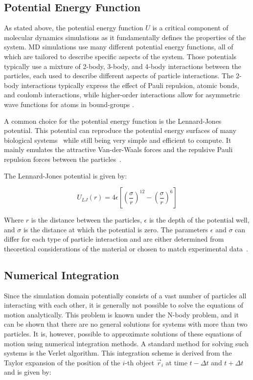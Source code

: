 \subsection{Potential Energy Function}

As stated above, the potential energy function $U$ is a critical component of molecular dynamics simulations as it fundamentally defines the properties of the system. MD simulations use many different potential energy functions, all of which are tailored to describe specific aspects of the system. Those potentials typically use a mixture of 2-body, 3-body, and 4-body interactions between the particles, each used to describe different aspects of particle interactions. The 2-body interactions typically express the effect of Pauli repulsion, atomic bonds, and coulomb interactions, while higher-order interactions allow for asymmetric wave functions for atoms in bound-groups \cite{Leimkuhler2015}.

A common choice for the potential energy function is the Lennard-Jones potential. This potential can reproduce the potential energy surfaces of many biological systems~\cite{NexusPhysicsLennardJones} while still being very simple and efficient to compute. It mainly emulates the attractive Van-der-Waals forces and the repulsive Pauli repulsion forces between the particles~\cite{ChemieLexikonLennardJones}.

The Lennard-Jones potential is given by:

\begin{equation}
      U_{LJ}(r) = 4 \epsilon \left[ \left( \frac{\sigma}{r} \right)^{12} - \left( \frac{\sigma}{r} \right)^6 \right]
\end{equation}


Where $r$ is the distance between the particles, $\epsilon$ is the depth of the potential well, and $\sigma$ is the distance at which the potential is zero. The parameters $\epsilon$ and $\sigma$ can differ for each type of particle interaction and are either determined from theoretical considerations of the material or chosen to match experimental data~\cite{Maghfiroh2020}.


\subsection{Numerical Integration}

Since the simulation domain potentially consists of a vast number of particles all interacting with each other, it is generally not possible to solve the equations of motion analytically. This problem is known under the N-body problem, and it can be shown that there are no general solutions for systems with more than two particles. It is, however, possible to approximate solutions of these equations of motion using numerical integration methods. A standard method for solving such systems is the Verlet algorithm. This integration scheme is derived from the Taylor expansion of the position of the $i$-th object $\vec{r}_i$ at time $t - \Delta t$ and $t + \Delta t$ and is given by:

